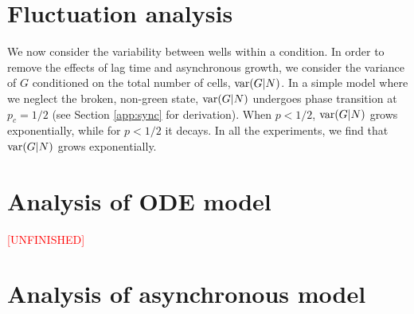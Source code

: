 \documentclass{article}
\begin{document}
\section{Fluctuation analysis}
We now consider the variability between wells within a condition. In order to remove the effects of lag time and asynchronous  growth, we consider the variance  of $G$ conditioned on the total number of cells, ${\rm var}(G|N)$. In a simple model where we neglect the broken, non-green state, ${\rm var}(G|N)$ undergoes phase transition at $p_c = 1/2$ (see Section \ref{app:sync} for derivation). When $p<1/2$, ${\rm var}(G|N)$ grows exponentially, while for $p<1/2$ it decays. In all the experiments, we find that ${\rm var}(G|N)$ grows exponentially. 

\newpage

\appendix

\section{Analysis of ODE model }\label{app:ode}
\textcolor{red}{[UNFINISHED]}

\section{Analysis of asynchronous model}\label{app:async}
\end{document}
